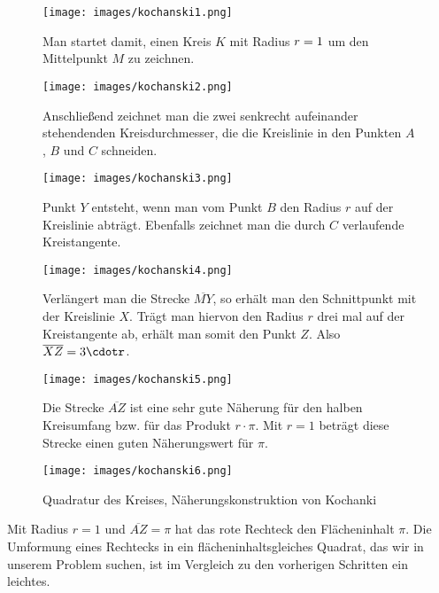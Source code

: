 \documentclass[11pt]{article}
\begin{document}
    

\begin{SCfigure}[50][!h]
 \centering
\caption*{\normalsize Man startet damit, einen Kreis $K$ mit Radius \(\LARGE r=1\)  um den Mittelpunkt $M$
zu zeichnen.}\texttt{[image: images/kochanski1.png]}
\end{SCfigure}
\begin{SCfigure}[50][!h]
 \centering
\caption*{\normalsize Anschließend zeichnet man die zwei senkrecht aufeinander stehendenden Kreisdurchmesser, die die Kreislinie in den Punkten $A$, $B$ und $C$ schneiden.}
\texttt{[image: images/kochanski2.png]}
\end{SCfigure}
\begin{SCfigure}[50][!h]
 \centering
\caption*{\normalsize Punkt $Y$ entsteht, wenn man vom Punkt $B$ den Radius \(r\) auf der Kreislinie abträgt. Ebenfalls zeichnet man die durch $C$ verlaufende Kreistangente.}
\texttt{[image: images/kochanski3.png]}
\end{SCfigure}
\begin{SCfigure}[50][!h]
 \centering
\caption*{\normalsize Verlängert man die Strecke \(\overline{MY}\), so erhält man den Schnittpunkt mit der Kreislinie $X$. Trägt man hiervon den Radius \(r\) drei mal auf der Kreistangente ab, erhält man somit den Punkt $Z$. Also \(\overline{XZ}=3\cdotr\).}
\texttt{[image: images/kochanski4.png]}                      
\end{SCfigure}
\begin{SCfigure}[50][!htb]
 \centering
\caption*{\normalsize Die Strecke \(\overline{AZ}\) ist eine sehr gute Näherung für den halben Kreisumfang bzw. für das Produkt \(r\cdot\pi\). Mit \(r=1\) beträgt diese Strecke einen guten Näherungswert für \(\pi\).}
\texttt{[image: images/kochanski5.png]}
\end{SCfigure}

\clearpage
\begin{figure}

    \texttt{[image: images/kochanski6.png]}
    \caption{Quadratur des Kreises, Näherungskonstruktion von Kochanki}\label{qudr_circ}
    \newline\end{figure}
    \normalsize Mit Radius \(r=1\) und \(\overline{AZ}=\pi\) hat das rote Rechteck den Flächeninhalt \(\pi\). Die Umformung eines Rechtecks in ein flächeninhaltsgleiches Quadrat, das wir in unserem Problem suchen, ist im Vergleich zu den vorherigen Schritten ein leichtes.
\end{document}
